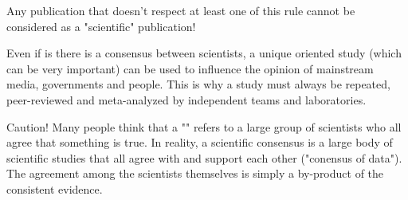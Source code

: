 	Any publication that doesn't respect at least one of this rule cannot be considered as a "scientific" publication!
	\begin{tcolorbox}[title=Remark,colframe=black,arc=10pt]
	Even if is there is a consensus between scientists, a unique oriented study (which can be very important) can be used to influence the opinion of mainstream media, governments and people. This is why a study must always be repeated, peer-reviewed and meta-analyzed by independent teams and laboratories.
	\end{tcolorbox}
	Caution! Many people think that a "" refers to a large group of scientists who all agree that something is true. In reality, a scientific consensus is a large body of scientific studies that all agree with and support each other ("conensus of data"). The agreement among the scientists themselves is simply a by-product of the consistent evidence.
	
